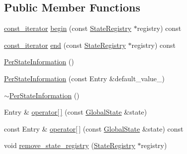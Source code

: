 \subsection*{Public Member Functions}
\begin{DoxyCompactItemize}
\item 
\hyperlink{classPerStateInformation_1_1const__iterator}{const\-\_\-iterator} \hyperlink{classPerStateInformation_ad03073226e0e42ffa5b48d952845ae99}{begin} (const \hyperlink{classStateRegistry}{State\-Registry} $\ast$registry) const 
\item 
\hyperlink{classPerStateInformation_1_1const__iterator}{const\-\_\-iterator} \hyperlink{classPerStateInformation_ab1fdaf457e8c0e68a5791e9356b3b71c}{end} (const \hyperlink{classStateRegistry}{State\-Registry} $\ast$registry) const 
\item 
\hyperlink{classPerStateInformation_a6ad95af1e3b3ee3ee7d30c66409a2f22}{Per\-State\-Information} ()
\item 
\hyperlink{classPerStateInformation_a25865d5bc64801f8cf17e7a19665b03e}{Per\-State\-Information} (const Entry \&default\-\_\-value\-\_\-)
\item 
\hyperlink{classPerStateInformation_a783e0227e4688f6b0d44d6af9308c464}{$\sim$\-Per\-State\-Information} ()
\item 
Entry \& \hyperlink{classPerStateInformation_a872e037dbe9bd1e8e655a5477b9de6c8}{operator\mbox{[}$\,$\mbox{]}} (const \hyperlink{classGlobalState}{Global\-State} \&state)
\item 
const Entry \& \hyperlink{classPerStateInformation_a88c6b4e42906429dcea19ea8cf7f1bf1}{operator\mbox{[}$\,$\mbox{]}} (const \hyperlink{classGlobalState}{Global\-State} \&state) const 
\item 
void \hyperlink{classPerStateInformation_a51be9232da57e237354f3a32739c13ec}{remove\-\_\-state\-\_\-registry} (\hyperlink{classStateRegistry}{State\-Registry} $\ast$registry)
\end{DoxyCompactItemize}


